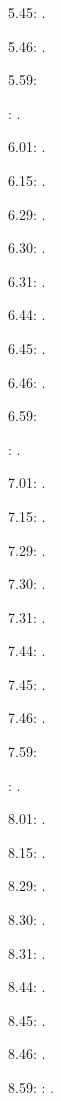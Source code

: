 \documentclass[italian]{article}
\begin{document}
5.45:   .

5.46:   .

5.59:   

:  .

6.01:   . 

6.15:   . 

6.29:   . 

6.30:   .

6.31:   .

6.44:   .

6.45:   .

6.46:   .

6.59:   

:  .

7.01:   . 

7.15:   . 

7.29:   . 

7.30:   .

7.31:   .

7.44:   .

7.45:   .

7.46:   .

7.59:   

:  .

8.01:   . 

8.15:   . 

8.29:   . 

8.30:   .

8.31:   .

8.44:   .

8.45:   .

8.46:   .

8.59:   
:  .
\end{document}
